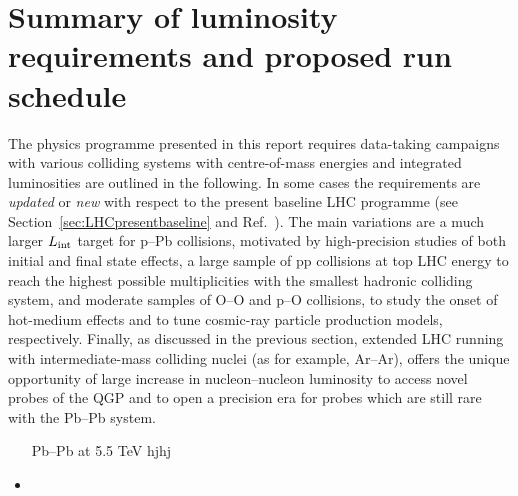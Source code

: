 \documentclass[../report.tex]{subfiles}
\begin{document}
\section{Summary of luminosity requirements and proposed run schedule}
\label{sec:schedule}

The physics programme presented in this report requires data-taking campaigns with various colliding systems with centre-of-mass energies and integrated luminosities are outlined in the following. In some cases the requirements are {\it updated} or {\it new} with respect to the present baseline LHC programme (see Section~\ref{sec:LHCpresentbaseline} and Ref.~\cite{Abelevetal:2014cna}). The main variations are a much larger $L_{\rm int}$ target for p--Pb collisions, motivated by high-precision studies of both initial and final state effects, a large sample of pp collisions at top LHC energy to reach the highest possible multiplicities with the smallest hadronic colliding system, and moderate samples of O--O and p--O collisions, to study the onset of hot-medium effects and to tune cosmic-ray particle production models, respectively. Finally, as discussed in the previous section, extended LHC running with intermediate-mass colliding nuclei (as for example, Ar--Ar), offers the unique opportunity of large increase in nucleon--nucleon luminosity to access novel probes of the QGP and to open a precision era for probes which are still rare with the Pb--Pb system.   

\begin{itemize}
\item[Pb--Pb at 5.5 TeV] hjhj 

\item 

\end{itemize}
\end{document}
